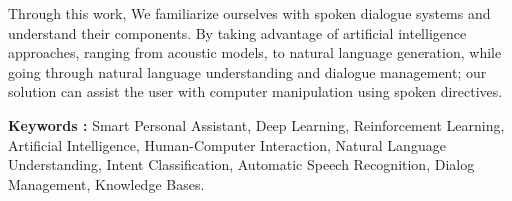 Through this work, We familiarize ourselves with spoken dialogue systems and understand their components. By taking advantage of artificial intelligence approaches, ranging from acoustic models, to natural language generation, while going through natural language understanding and dialogue management; our solution can assist the user with computer manipulation using spoken directives.

\noindent
\textbf{Keywords :} Smart Personal Assistant, Deep Learning, Reinforcement Learning, Artificial Intelligence, Human-Computer Interaction, Natural Language Understanding, Intent Classification, Automatic Speech Recognition, Dialog Management, Knowledge Bases.